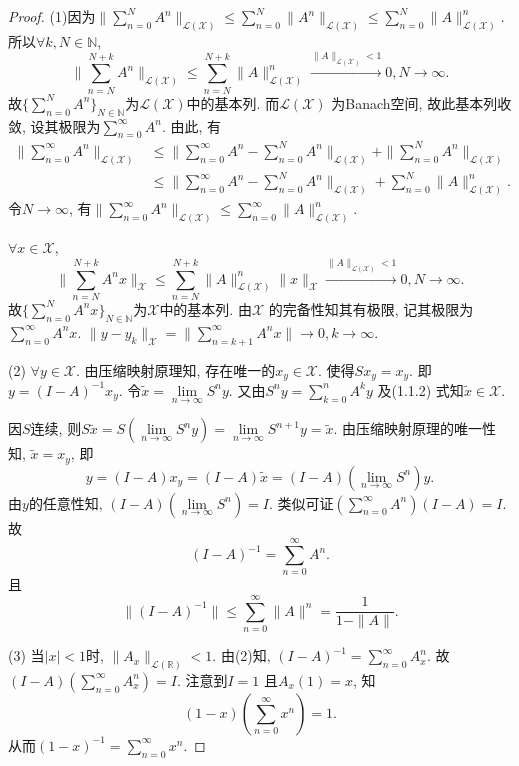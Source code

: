 \documentclass[UTF8,twoside]{ctexbook}
\newcommand{\h}{\mathscr}
\newcommand{\kx}{\mathbb}
\numberwithin{equation}{section}
\begin{document}
	\begin{proof}
		(1)因为$\|\sum_{n=0}^{N}A^n\|_{\h L(\h X)}\leq\sum_{n=0}^{N}\|A^n\|_{\h L(\h X)}\leq\sum_{n=0}^{N}\|A\|^n_{\h L(\h X)}$. 所以$\forall k,N\in\kx N$,
		\[
		\|\sum_{n=N}^{N+k}A^n\|_{\h L(\h X)}\leq\sum_{n=N}^{N+k}\|A\|^n_{\h L(\h X)}\xrightarrow{\|A\|_{\h L(\h X)}<1} 0, N\rightarrow\infty.
		\]
		故$\{\sum_{n=0}^{N}A^n\}_{N\in\kx N}$为$\h L(\h X)$中的基本列. 而$\h L(\h X)$ 为Banach空间, 故此基本列收敛, 设其极限为$\sum_{n=0}^{\infty}A^n$. 由此, 有
		\[
		\begin{aligned}
		\|\sum_{n=0}^{\infty}A^n\|_{\h L(\h X)}&\leq\|\sum_{n=0}^{\infty}A^n-\sum_{n=0}^{N}A^n\|_{\h L(\h X)}+\|\sum_{n=0}^{N}A^n\|_{\h L(\h X)}\\
		&\leq\|\sum_{n=0}^{\infty}A^n-\sum_{n=0}^{N}A^n\|_{\h L(\h X)}+\sum_{n=0}^{N}\|A\|^n_{\h L(\h X)}.
		\end{aligned}
		\]
		令$N\rightarrow\infty$, 有$\|\sum_{n=0}^{\infty}A^n\|_{\h L(\h X)}\leq\sum_{n=0}^{\infty}\|A\|^n_{\h L(\h X)}$.

		$\forall x\in\h X$,
		\[
		\|\sum_{n=N}^{N+k}A^nx\|_{\h X}\leq\sum_{n=N}^{N+k}\|A\|^n_{\h L(\h X)}\|x\|_{\h X}\xrightarrow{\|A\|_{\h L(\h X)}<1} 0,N\rightarrow\infty.
		\]
		故$\{\sum_{n=0}^{N}A^nx\}_{N\in\kx N}$为$\h X$中的基本列. 由$\h X$ 的完备性知其有极限, 记其极限为$\sum_{n=0}^{\infty}A^nx$. $\|y-y_k\|_{\h X}=\|\sum_{n=k+1}^{\infty}A^nx\|\rightarrow 0,k\rightarrow\infty$.

		(2) $\forall y\in\h X$. 由压缩映射原理知, 存在唯一的$x_y\in\h X$. 使得$Sx_y=x_y$. 即$y=(I-A)^{-1}x_y$. 令$\widetilde x=\lim\limits_{n\rightarrow\infty}S^n y$. 又由$S^ny=\sum\limits_{k=0}^{n}A^ky$ 及(1.1.2) 式知$\widetilde x\in\h X$.

		因$S$连续, 则$S\widetilde x=S(\lim\limits_{n\rightarrow\infty}S^ny)=\lim\limits_{n\rightarrow\infty}S^{n+1}y=\widetilde x$. 由压缩映射原理的唯一性知, $\widetilde x=x_y$, 即
		\[
		y=(I-A)x_y=(I-A)\widetilde x=(I-A)(\lim_{n\rightarrow\infty}S^n)y.
		\]
		由$y$的任意性知, $(I-A)(\lim\limits_{n\rightarrow\infty}S^n)=I$. 类似可证$(\sum\limits_{n=0}^{\infty}A^n)(I-A)=I$. 故
		\[(I-A)^{-1}=\sum_{n=0}^{\infty}A^n.\]
		且\[
		\|(I-A)^{-1}\|\leq\sum_{n=0}^{\infty}\|A\|^n=\frac{1}{1-\|A\|}.
		\]

		(3) 当$|x|<1$时, $\|A_x\|_{\h L(\kx R)}<1$. 由(2)知, $(I-A)^{-1}=\sum\limits_{n=0}^{\infty}A_x^n$. 故$(I-A)(\sum\limits_{n=0}^{\infty}A_x^n)=I$. 注意到$I=1$ 且$A_x(1)=x$, 知
		\[
		(1-x)(\sum_{n=0}^{\infty}x^n)=1.
		\]
		从而$(1-x)^{-1}=\sum\limits_{n=0}^{\infty}x^n$.
	\end{proof}
\end{document}
